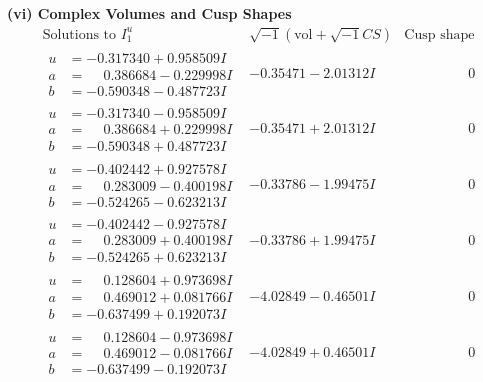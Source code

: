 \documentclass[1p]{elsarticle_modified}
\theoremstyle{definition}
\newcommand{\I}{\sqrt{-1}}
\begin{document}
\newpage\flushleft \textbf{(vi) Complex Volumes and Cusp Shapes}
$$\begin{array}{c|c|c}  
\text{Solutions to }I^u_{1}& \I (\text{vol} + \sqrt{-1}CS) & \text{Cusp shape}\\
 \hline 
\begin{aligned}
u &= -0.317340 + 0.958509 I \\
a &= \phantom{-}0.386684 - 0.229998 I \\
b &= -0.590348 - 0.487723 I\end{aligned}
 & -0.35471 - 2.01312 I & \phantom{-0.000000 } 0 \\ \hline\begin{aligned}
u &= -0.317340 - 0.958509 I \\
a &= \phantom{-}0.386684 + 0.229998 I \\
b &= -0.590348 + 0.487723 I\end{aligned}
 & -0.35471 + 2.01312 I & \phantom{-0.000000 } 0 \\ \hline\begin{aligned}
u &= -0.402442 + 0.927578 I \\
a &= \phantom{-}0.283009 - 0.400198 I \\
b &= -0.524265 - 0.623213 I\end{aligned}
 & -0.33786 - 1.99475 I & \phantom{-0.000000 } 0 \\ \hline\begin{aligned}
u &= -0.402442 - 0.927578 I \\
a &= \phantom{-}0.283009 + 0.400198 I \\
b &= -0.524265 + 0.623213 I\end{aligned}
 & -0.33786 + 1.99475 I & \phantom{-0.000000 } 0 \\ \hline\begin{aligned}
u &= \phantom{-}0.128604 + 0.973698 I \\
a &= \phantom{-}0.469012 + 0.081766 I \\
b &= -0.637499 + 0.192073 I\end{aligned}
 & -4.02849 - 0.46501 I & \phantom{-0.000000 } 0 \\ \hline\begin{aligned}
u &= \phantom{-}0.128604 - 0.973698 I \\
a &= \phantom{-}0.469012 - 0.081766 I \\
b &= -0.637499 - 0.192073 I\end{aligned}
 & -4.02849 + 0.46501 I & \phantom{-0.000000 } 0 \\ \hline\begin{aligned}

\end{aligned}
\end{array}$$
\end{document}
